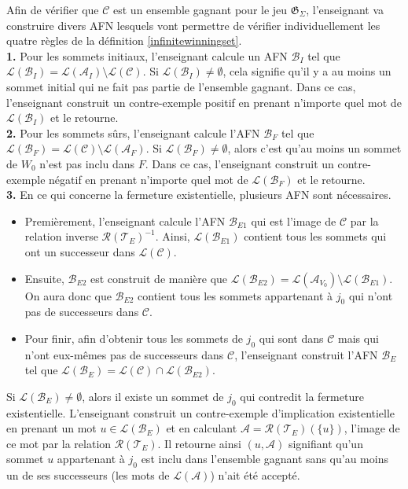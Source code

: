\documentclass[12pt,a4paper,oneside,titlepage]{report}
\begin{document}
Afin de vérifier que $\mathcal{C}$ est un ensemble gagnant pour le jeu $\mathfrak{G}_\Sigma$, l'enseignant va construire divers AFN lesquels vont permettre de vérifier individuellement les quatre règles de la définition \ref{infinitewinningset}.\\
\newpage
\noindent \textbf{1.} Pour les sommets initiaux, l'enseignant calcule un AFN $\mathcal{B}_I$ tel que $\mathcal{L}(\mathcal{B}_I)=\mathcal{L}(\mathcal{A}_I)\setminus\mathcal{L}(\mathcal{C})$. Si $\mathcal{L}(\mathcal{B}_I)\neq\emptyset$, cela signifie qu'il y a au moins un sommet initial qui ne fait pas partie de l'ensemble gagnant. Dans ce cas, l'enseignant construit un contre-exemple positif en prenant n'importe quel mot de $\mathcal{L}(\mathcal{B}_I)$ et le retourne.\\

\noindent\textbf{2.} Pour les sommets sûrs, l'enseignant calcule l'AFN $\mathcal{B}_F$ tel que $\mathcal{L}(\mathcal{B}_F)=\mathcal{L}(\mathcal{C})\setminus\mathcal{L}(\mathcal{A}_F)$. Si $\mathcal{L}(\mathcal{B}_F)\neq\emptyset$, alors c'est qu'au moins un sommet de $W_0$ n'est pas inclu dans $F$. Dans ce cas, l'enseignant construit un contre-exemple négatif en prenant n'importe quel mot de $\mathcal{L}(\mathcal{B}_F)$ et le retourne.\\

\noindent\textbf{3.} En ce qui concerne la fermeture existentielle, plusieurs AFN sont nécessaires. 
\begin{itemize}
\item Premièrement, l'enseignant calcule l'AFN $\mathcal{B}_{E1}$ qui est l'image de $\mathcal{C}$ par la relation inverse $\mathcal{R}(\mathcal{T}_E)^{-1}$. Ainsi, $\mathcal{L}(\mathcal{B}_{E1})$ contient tous les sommets qui ont un successeur dans $\mathcal{L}(\mathcal{C})$. \item Ensuite, $\mathcal{B}_{E2}$ est construit de manière que $\mathcal{L}(\mathcal{B}_{E2})=\mathcal{L}(\mathcal{A}_{V_0})\setminus\mathcal{L}(\mathcal{B}_{E1})$. On aura donc que $\mathcal{B}_{E2}$ contient tous les sommets appartenant à $j_0$ qui n'ont pas de successeurs dans $\mathcal{C}$. 
\item Pour finir, afin d'obtenir tous les sommets de $j_0$ qui sont dans $\mathcal{C}$ mais qui n'ont eux-mêmes pas de successeurs dans $\mathcal{C}$, l'enseignant construit l'AFN $\mathcal{B}_E$ tel que $\mathcal{L}(\mathcal{B}_E)=\mathcal{L}(\mathcal{C})\cap\mathcal{L}(\mathcal{B}_{E2})$. 
\end{itemize}
Si $\mathcal{L}(\mathcal{B}_E)\neq\emptyset$, alors il existe un sommet de $j_0$ qui contredit la fermeture existentielle. L'enseignant construit un contre-exemple d'implication existentielle en prenant un mot $u\in\mathcal{L}(\mathcal{B}_E)$ et en calculant $\mathcal{A}=\mathcal{R}(\mathcal{T}_E)(\{u\})$, l'image de ce mot par la relation $\mathcal{R}(\mathcal{T}_E)$. Il retourne ainsi $(u,\mathcal{A})$ signifiant qu'un sommet $u$ appartenant à $j_0$ est inclu dans l'ensemble gagnant sans qu'au moins un de ses successeurs (les mots de $\mathcal{L}(\mathcal{A})$) n'ait été accepté.\\
\end{document}
